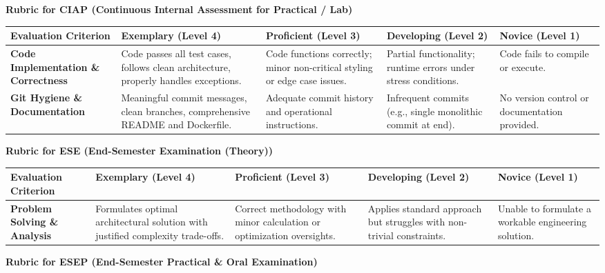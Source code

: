 \documentclass[10pt,a4paper]{article}
\begin{document}
\vspace{4pt}
{\normalsize\textbf{\color{nbaNavy}Rubric for CIAP (Continuous Internal Assessment for Practical / Lab)}}
\begin{table}[h!]
\centering
\footnotesize
\begin{tabularx}{\textwidth}{L{2.8cm} Y Y Y Y}
\toprule
{}
\textbf{Evaluation Criterion} & \textbf{Exemplary (Level 4)} & \textbf{Proficient (Level 3)} & \textbf{Developing (Level 2)} & \textbf{Novice (Level 1)} \\
\midrule
\textbf{Code Implementation \& Correctness} & Code passes all test cases, follows clean architecture, properly handles exceptions. & Code functions correctly; minor non-critical styling or edge case issues. & Partial functionality; runtime errors under stress conditions. & Code fails to compile or execute. \\
 \hline \textbf{Git Hygiene \& Documentation} & Meaningful commit messages, clean branches, comprehensive README and Dockerfile. & Adequate commit history and operational instructions. & Infrequent commits (e.g., single monolithic commit at end). & No version control or documentation provided. \\
\bottomrule
\end{tabularx}
\end{table}
\vspace{4pt}
{\normalsize\textbf{\color{nbaNavy}Rubric for ESE (End-Semester Examination (Theory))}}
\begin{table}[h!]
\centering
\footnotesize
\begin{tabularx}{\textwidth}{L{2.8cm} Y Y Y Y}
\toprule
{}
\textbf{Evaluation Criterion} & \textbf{Exemplary (Level 4)} & \textbf{Proficient (Level 3)} & \textbf{Developing (Level 2)} & \textbf{Novice (Level 1)} \\
\midrule
\textbf{Problem Solving \& Analysis} & Formulates optimal architectural solution with justified complexity trade-offs. & Correct methodology with minor calculation or optimization oversights. & Applies standard approach but struggles with non-trivial constraints. & Unable to formulate a workable engineering solution. \\
\bottomrule
\end{tabularx}
\end{table}
\vspace{4pt}
{\normalsize\textbf{\color{nbaNavy}Rubric for ESEP (End-Semester Practical \& Oral Examination)}}
\end{document}
